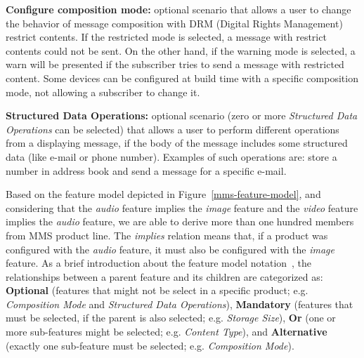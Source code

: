 \documentclass{acm_proc_article-sp}
\begin{document}

{\bf Configure composition mode:} optional scenario that allows a user to change the behavior of message composition with DRM (Digital Rights Management) restrict contents. If the restricted mode is selected, a message with restrict contents could not be sent. On the other hand, if the warning mode is selected, a warn will be presented if the subscriber tries to send a message with restricted content. Some devices can be configured at build time with a specific composition mode, not allowing a subscriber to change it. 

{\bf Structured Data Operations:} optional scenario (zero or more \emph{Structured Data Operations} can be selected) that allows a user to perform different operations from a displaying message, if the body of the message includes some structured data (like e-mail or phone number). Examples of such operations are: store a number in address book and send a message for a specific e-mail.

Based on the feature model depicted in Figure~\ref{mms-feature-model}, and considering that the \emph{audio} feature implies the \emph{image} feature and the \emph{video} feature implies the \emph{audio} feature, we are able to derive more than one hundred members from MMS product line. The \emph{implies} relation means that, if a product was configured with the \emph{audio} feature, it must also be configured with the \emph{image} feature. As a brief introduction about the feature model notation~\cite{czarnecki-book,gheyi-alloy-06}, the relationships between a parent feature and its children are categorized as: {\bf Optional} (features that might not be select in a specific product; e.g. \emph{Composition Mode} and \emph{Structured Data Operations}), {\bf Mandatory} (features that must be selected, if the parent is also selected; e.g. \emph{Storage Size}), {\bf Or} (one or more sub-features might be selected; e.g. \emph{Content Type}), and {\bf Alternative} (exactly one sub-feature must be selected; e.g. \emph{Composition Mode}).

\begin{figure*}
\centering
{}
\caption{MMS feature model}
\label{mms-feature-model}
\end{figure*}
\end{document}
